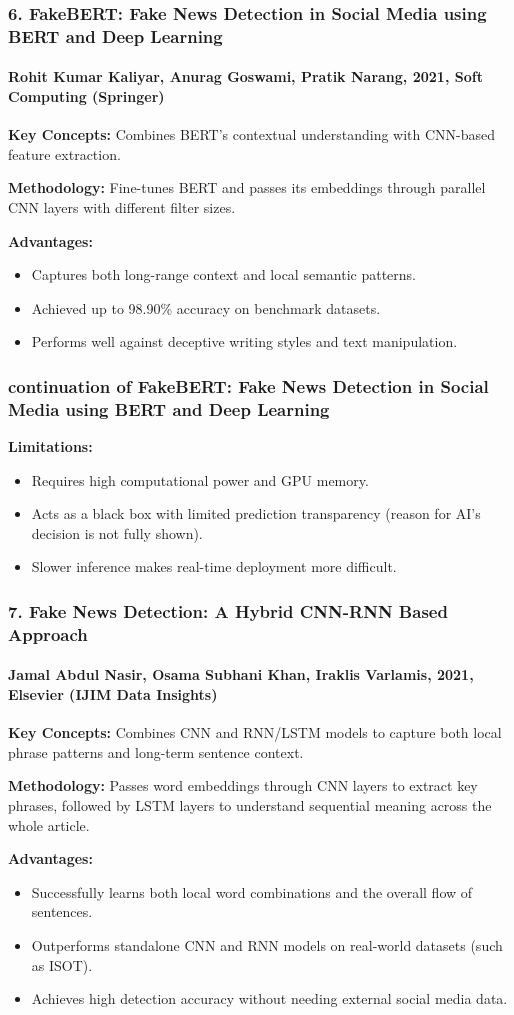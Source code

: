 \documentclass{beamer}
\begin{document}
\begin{frame}
\frametitle{6. FakeBERT: Fake News Detection in Social Media using BERT and Deep Learning}
\framesubtitle{Rohit Kumar Kaliyar, Anurag Goswami, Pratik Narang, 2021, Soft Computing (Springer)}
\small{
\textbf{Key Concepts:} Combines BERT's contextual understanding with CNN-based feature extraction. \par\vspace{0.15cm}
\textbf{Methodology:} Fine-tunes BERT and passes its embeddings through parallel CNN layers with different filter sizes. \par\vspace{0.15cm}
\textbf{Advantages:}
\begin{itemize}
    \item Captures both long-range context and local semantic patterns.
    \item Achieved up to 98.90\% accuracy on benchmark datasets.
    \item Performs well against deceptive writing styles and text manipulation.
\end{itemize}
}
\end{frame}

\begin{frame}
\frametitle{continuation of FakeBERT: Fake News Detection in Social Media using BERT and Deep Learning}
\large{
\textbf{Limitations:}
\begin{itemize}
    \item Requires high computational power and GPU memory.
    \item Acts as a black box with limited prediction transparency (reason for AI's decision is not fully shown).
    \item Slower inference makes real-time deployment more difficult.
\end{itemize}
}
\end{frame}

\begin{frame}
\frametitle{7. Fake News Detection: A Hybrid CNN-RNN Based Approach}
\framesubtitle{Jamal Abdul Nasir, Osama Subhani Khan, Iraklis Varlamis, 2021, Elsevier (IJIM Data Insights)}
\small{
\textbf{Key Concepts:} Combines CNN and RNN/LSTM models to capture both local phrase patterns and long-term sentence context. \par\vspace{0.15cm}
\textbf{Methodology:} Passes word embeddings through CNN layers to extract key phrases, followed by LSTM layers to understand sequential meaning across the whole article. \par\vspace{0.15cm}
\textbf{Advantages:}
\begin{itemize}
    \item Successfully learns both local word combinations and the overall flow of sentences.
    \item Outperforms standalone CNN and RNN models on real-world datasets (such as ISOT).
    \item Achieves high detection accuracy without needing external social media data.
\end{itemize}
}
\end{frame}
\end{document}
